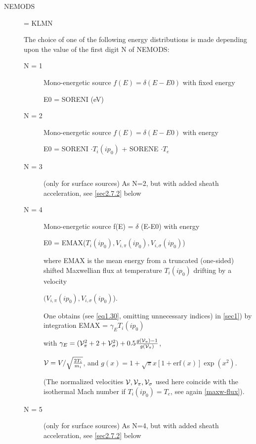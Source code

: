 \begin{description}
  \item[NEMODS] = KLMN 

        The choice of one of the following energy distributions is made depending upon
        the value of the first digit N of NEMODS:
        \begin{description}
          \item[N = 1] Mono-energetic source $f(E) = \delta (E-E0)$ with fixed energy

                E0 = SORENI (\si{\electronvolt})
          \item[N = 2] Mono-energetic source $f(E) =
                  \delta (E-E0)$ with energy 

                E0 = SORENI $\cdot T_i(ip_0) $ + SORENE $\cdot T_e $ 

          \item[N = 3] (only for surface sources) As N=2, but with added sheath
                acceleration, see \cref{sec2.7.2} below 

          \item[N = 4] Mono-energetic source f(E) = $\delta$ (E-E0) with energy

                E0 = EMAX($T_i(ip_0),V_{i,\pi}(ip_0),V_{i,\sigma}(ip_0)$) 

                where EMAX is the mean energy from a truncated (one-sided) shifted Maxwellian
                flux at temperature $T_i(ip_0)$ drifting by a velocity 

                $(V_{i,\pi}(ip_0), V_{i,\sigma}(ip_0)$).

                One obtains (see \cref{eq1.30}, omitting unnecessary indices) in \cref{sec1})
                by integration EMAX = $\gamma_E   T_i(ip_0) $ 

                with $\gamma_E = ( {\cal V}_{\pi}^2  +	 2   +	{\cal V}_{\sigma}^ 2	 )   +
                   0.5 \frac{g({\cal V}_{\pi} ) - 1}{g ({\cal V}_{\pi} )}$, 

                ${\cal V} = V / \sqrt{\frac{{2 T_i}}{{m_i}}}$, and $g(x) = 1 + \sqrt{\pi} x  [
                      1 + \mbox{erf}(x) ]   \exp(x^2 )$.

                (The normalized velocities ${\cal V}, {\cal V}_{\pi}, {\cal V}_{\sigma}$ used
                here coincide with the isothermal Mach number if $T_i(ip_0) = T_e$, see again
                \cref{maxw-flux}).
          \item[N = 5] (only for surface sources) As N=4, but with added sheath
                acceleration, see \cref{sec2.7.2} below 


\end{description}
\end{description}
